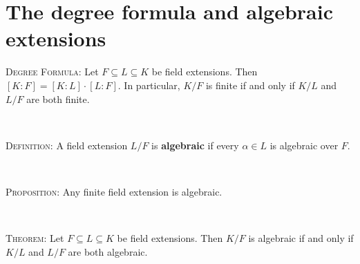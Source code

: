 \documentclass[12pt]{amsart}
\newcommand{\showsol}[1]{\def\displaysol{#1}}
\begin{document}
\showsol{0}
	
	\thispagestyle{empty}
	
	\section*{The degree formula and algebraic extensions}
	\begin{framed}
	\textsc{Degree Formula:} Let $F\subseteq L \subseteq K$ be field extensions. Then $[K:F] = [K:L] \cdot [L:F]$. In particular, $K/F$ is finite if and only if $K/L$ and $L/F$ are both finite.
	
	\
	
	\textsc{Definition:} A field extension $L/F$ is \textbf{algebraic} if every $\alpha\in L$ is algebraic over $F$.
	
	\
	
	\textsc{Proposition:} Any finite field extension is algebraic.
	
	\
	
	\textsc{Theorem:} Let $F\subseteq L \subseteq K$ be field extensions. Then $K/F$ is algebraic if and only if $K/L$ and $L/F$ are both algebraic.
		\end{framed}

\
\end{document}
